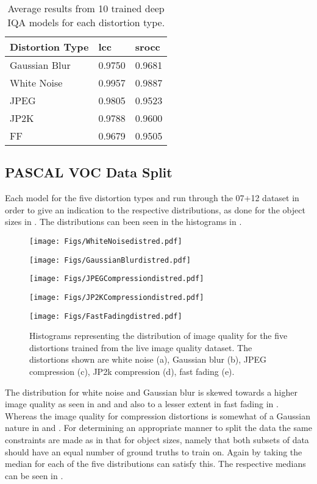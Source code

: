 \documentclass[a4paper,twoside]{article}
\begin{document}
\begin{table}[h]
\centering
\caption{Average results from 10 trained deep IQA models for each distortion type.}
\label{tab:iqaavg}
\begin{tabular}{|l|l|l|}
\hline
\textbf{Distortion Type} & \textbf{\gls{lcc}}    & \textbf{\gls{srocc}}  \\ \hline
Gaussian Blur   & 0.9750 & 0.9681 \\ \hline
White Noise     & 0.9957 & 0.9887 \\ \hline
JPEG            & 0.9805 & 0.9523 \\ \hline
JP2K            & 0.9788 & 0.9600 \\ \hline
FF     & 0.9679 & 0.9505 \\ \hline
\end{tabular}
\end{table}


\subsection{PASCAL VOC Data Split}
Each model for the five distortion types and run through the 07+12 dataset in order to give an indication to the respective distributions, as done for the object sizes in . The distributions can been seen in the histograms in .

\begin{figure*}[!h]
  \texttt{[image: Figs/WhiteNoisedistred.pdf]}
  \caption*{}\label{fig:}
\endminipage\hfill
{}
  \texttt{[image: Figs/GaussianBlurdistred.pdf]}
  \caption*{}\label{fig:}
\endminipage\hfill
{}
  \texttt{[image: Figs/JPEGCompressiondistred.pdf]}
  \caption*{}\label{fig:}
\endminipage\hfill
{}
  \texttt{[image: Figs/JP2KCompressiondistred.pdf]}
  \caption*{}\label{fig:}
\endminipage\hfill
{}%
  \texttt{[image: Figs/FastFadingdistred.pdf]}
  \caption*{}\label{fig:}
\endminipage
\caption{Histograms representing the distribution of image quality for the five distortions trained from the \gls{live} image quality dataset. The distortions shown are white noise (a), Gaussian blur (b), JPEG compression (c), JP2k compression (d), fast fading (e).}
\label{fig:iqdist}
\end{figure*}

The distribution for white noise and Gaussian blur is skewed towards a higher image quality as seen in  and  and also to a lesser extent in fast fading in . Whereas the image quality for compression distortions is somewhat of a Gaussian nature in  and . For determining an appropriate manner to split the data the same constraints are made as in that for object sizes, namely that both subsets of data should have an equal number of ground truths to train on. Again by taking the median for each of the five distributions can satisfy this. The respective medians can be seen in .
\end{document}
